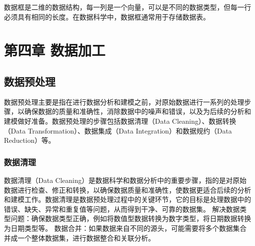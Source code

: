 \documentclass[]{book}
\begin{document}
数据框是二维的数据结构，每一列是一个向量，可以是不同的数据类型，但每一行必须具有相同的长度。在数据科学中，数据框通常用于存储数据表。

\hypertarget{ux7b2cux56dbux7ae0-ux6570ux636eux52a0ux5de5}{%
\chapter{第四章 数据加工}\label{ux7b2cux56dbux7ae0-ux6570ux636eux52a0ux5de5}}

\hypertarget{ux6570ux636eux9884ux5904ux7406}{%
\section{数据预处理}\label{ux6570ux636eux9884ux5904ux7406}}

数据预处理主要是指在进行数据分析和建模之前，对原始数据进行一系列的处理步骤，以确保数据的质量和准确性，消除数据中的噪声和错误，以及为后续的分析和建模做好准备。数据预处理的步骤包括数据清理（Data Cleaning）、数据转换（Data Transformation）、数据集成（Data Integration）和数据规约（Data Reduction）等。

\hypertarget{ux6570ux636eux6e05ux7406}{%
\subsection{数据清理}\label{ux6570ux636eux6e05ux7406}}

数据清理（Data Cleaning）是数据科学和数据分析中的重要步骤，指的是对原始数据进行检查、修正和转换，以确保数据质量和准确性，使数据更适合后续的分析和建模工作。数据清理是数据预处理过程中的关键环节，它的目标是处理数据中的错误、缺失、异常和重复值等问题，从而得到干净、可靠的数据集。
解决数据类型问题：确保数据类型正确，例如将数值型数据转换为数字类型，将日期数据转换为日期类型等。
数据合并：如果数据来自不同的源头，可能需要将多个数据集合并成一个整体数据集，进行数据整合和关联分析。
\end{document}
